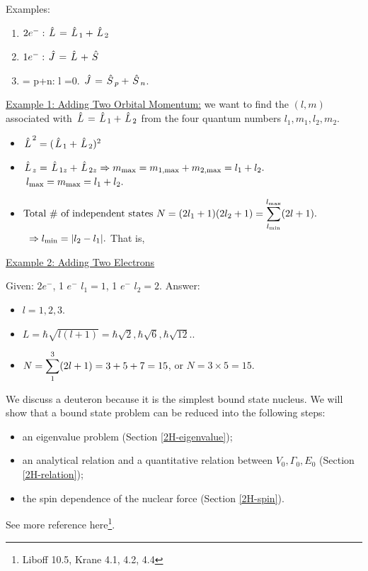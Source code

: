 \documentclass{school-22.101-notes}
\begin{document}
Examples:
\begin{enumerate}
\item $2e^-: \left. \hat{L} \right. = \left. \hat{L} \right._1 + \left. \hat{L} \right._2 $ 
\item $ 1 e^-: \left. \hat{J} \right. = \left. \hat{L} \right. + \left. \hat{S} \right.$
\item {} = p+n: l =0. $\left. \hat{J} \right. = \left. \hat{S} \right._p + \left. \hat{S} \right._n$. 
\end{enumerate}

\uline{Example 1: Adding Two Orbital Momentum:} we want to find the $(l,m)$ associated with $\left. \hat{L} \right.= \left. \hat{L} \right._1 + \left. \hat{L} \right._2$ from the four quantum numbers $l_1, m_1, l_2, m_2$. 
\begin{itemize}
\item $\left. \hat{L} \right.^2 = (\left. \hat{L} \right._1 + \left. \hat{L} \right._2)^2 $
\item $ \left. \hat{L} \right._z = \left. \hat{L} \right._{1z} + \left. \hat{L} \right._{2z} \Rightarrow m_{\mathrm{max}} = m_{\mathrm{1,max}} + m_{\mathrm{2,max}} = l_1 + l_2.$
$\mbox{ } l_{\mathrm{max}} = m_{\mathrm{max}} = l_1 + l_2.$
\item $ \mbox{Total \# of independent states } N = (2 l_1 + 1) (2l_2 + 1) = \displaystyle\sum_{l_{\mathrm{min}}}^{l_{\mathrm{max}}} (2l+1).$
$\mbox{ }\Rightarrow l_{\mathrm{min}} = |l_2 - l_1 |.$ That is,
\end{itemize}

\uline{Example 2: Adding Two Electrons}

Given: $ 2e^-$, 1 $e^-$ \@ $l_1 = 1$, 1 $e^-$ \@ $l_2 = 2$. Answer: 
\begin{itemize}
\item $l = 1,2,3$.
\item $L = \hbar \sqrt{l (l+1)} = \hbar \sqrt{2}, \hbar \sqrt{6}, \hbar \sqrt{12}.$.
\item $N = \displaystyle\sum_1^3 (2l+1) = 3 + 5 + 7 = 15$, or $N = 3 \times 5 = 15$. 
\end{itemize}

We discuss a deuteron  because it is the simplest bound state nucleus. We will show that a bound state problem can be reduced into the following steps:
\begin{itemize}
\item an eigenvalue problem (Section \ref{2H-eigenvalue});
\item an analytical relation and a quantitative relation between $V_0, \Gamma_0, E_0$ (Section \ref{2H-relation});
\item the spin dependence of the nuclear force (Section \ref{2H-spin}).
\end{itemize}
See more reference here\footnote{Liboff 10.5, Krane 4.1, 4.2, 4.4}.
\end{document}
